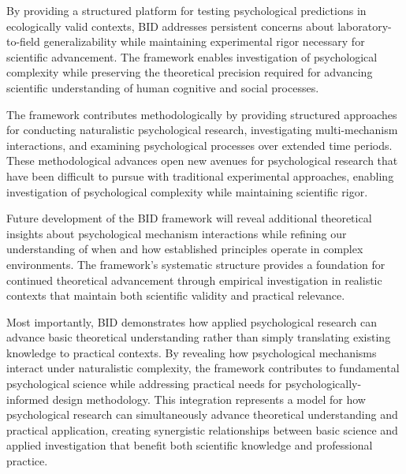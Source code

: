 \documentclass[
  authoryear,
  preprint]{elsarticle}
\begin{document}
By providing a structured platform for testing psychological predictions
in ecologically valid contexts, BID addresses persistent concerns about
laboratory-to-field generalizability while maintaining experimental
rigor necessary for scientific advancement. The framework enables
investigation of psychological complexity while preserving the
theoretical precision required for advancing scientific understanding of
human cognitive and social processes.

The framework contributes methodologically by providing structured
approaches for conducting naturalistic psychological research,
investigating multi-mechanism interactions, and examining psychological
processes over extended time periods. These methodological advances open
new avenues for psychological research that have been difficult to
pursue with traditional experimental approaches, enabling investigation
of psychological complexity while maintaining scientific rigor.

Future development of the BID framework will reveal additional
theoretical insights about psychological mechanism interactions while
refining our understanding of when and how established principles
operate in complex environments. The framework's systematic structure
provides a foundation for continued theoretical advancement through
empirical investigation in realistic contexts that maintain both
scientific validity and practical relevance.

Most importantly, BID demonstrates how applied psychological research
can advance basic theoretical understanding rather than simply
translating existing knowledge to practical contexts. By revealing how
psychological mechanisms interact under naturalistic complexity, the
framework contributes to fundamental psychological science while
addressing practical needs for psychologically-informed design
methodology. This integration represents a model for how psychological
research can simultaneously advance theoretical understanding and
practical application, creating synergistic relationships between basic
science and applied investigation that benefit both scientific knowledge
and professional practice.



\end{document}

